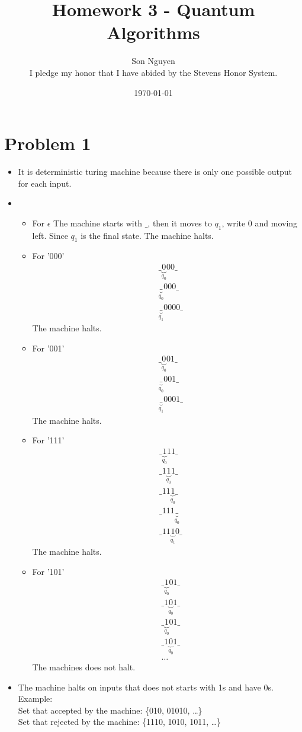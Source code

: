 \documentclass[12pt]{article}
\title{Homework 3 - Quantum Algorithms}
\author{Son Nguyen \\
I pledge my honor that I have abided by the Stevens Honor System.}
\date{\today}
\begin{document}
\maketitle
\section{Problem 1}
\begin{itemize}
    \item It is deterministic turing machine because there is only one possible output for each input.
    \item 
    \begin{itemize}
        \item For \(\epsilon\) The machine starts with \(\_\), then it moves to \(q_1\), write 0 and moving left. Since \(q_1\) is the final state. The machine halts.
        \item For '000'
        \begin{align*}
            & \_\underbrace{0}_{q_0}00 \_ \\
            & \underbrace{\_}_{q_0} 000 \_ \\
            &  \underbrace{\_}_{q_1} 0000\_
        \end{align*}
        The machine halts.
        \item For '001'
        \begin{align*}
            &\_ \underbrace{0}_{q_0}01 \_ \\
            & \underbrace{\_}_{q_0} 001 \_ \\
            &  \underbrace{\_}_{q_1} 0001\_
        \end{align*}
        The machine halts.
        \item For '111'
        \begin{align*}
            &\_ \underbrace{1}_{q_0}11 \_ \\
            & \_ 1 \underbrace{1}_{q_0} 1\_ \\
            & \_ 11\underbrace{1}_{q_0} \_ \\
            & \_ 111\underbrace{\_}_{q_0} \\
            & \_11\underbrace{1}_{q_1}0 \_ 
        \end{align*}
        The machine halts.
        \item For '101'
        \begin{align*}
            &\_ \underbrace{1}_{q_0}01 \_ \\
            & \_ 1 \underbrace{0}_{q_0} 1\_ \\
            & \_ \underbrace{1}_{q_0}01 \_ \\
            & \_ 1 \underbrace{0}_{q_0} 1\_ \\
            & \dots
        \end{align*}
        The machines does not halt. 
    \end{itemize}
    \item The machine halts on inputs that does not starts with 1s and have 0s. Example:\\
    Set that accepted by the machine: \{010, 01010, \dots \} \\
    Set that rejected by the machine: \{1110, 1010, 1011, \dots \}
\end{itemize}
\end{document}
